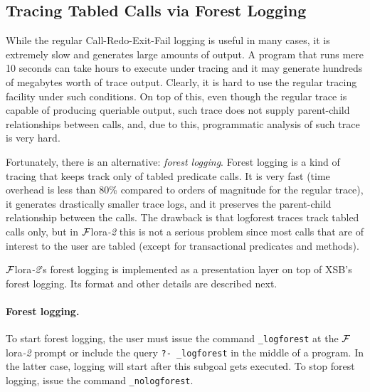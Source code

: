 \documentclass[11pt]{article}
\newcommand{\FLORA}{{\mbox{\sc ${\cal F}${lora}\rm\emph{-2}}}\xspace}
\begin{document}
\subsection{Tracing Tabled Calls via Forest Logging}

While the regular Call-Redo-Exit-Fail logging is useful in many cases, it
is extremely slow and generates large amounts of output. A program that
runs mere 10 seconds can take hours to execute under tracing and it may
generate hundreds of megabytes worth of trace output. Clearly, it is hard
to use the regular tracing facility under such conditions.
On top of this, even though the regular trace is capable of producing
queriable output, such trace does not supply parent-child 
relationships between calls, and, due to this, programmatic analysis of
such trace is very hard.

Fortunately, there is an alternative: \emph{forest logging}.
Forest logging is a kind of tracing that keeps track only of tabled
predicate calls. It is very fast (time overhead is less than 80\% compared
to orders of magnitude for the regular trace), it generates
drastically smaller trace logs, and it preserves the parent-child
relationship between the calls. The drawback is that logforest
traces track tabled calls
only, but in \FLORA this is not a serious problem since most calls that
are of interest to the user are
tabled (except for transactional predicates and methods).

\FLORA's forest logging is 
implemented as a presentation layer on top of XSB's forest logging.
Its format and other details are described next.

\paragraph{Forest logging.}
To start forest logging, the user
must issue the command {\tt \_logforest} at the \FLORA
prompt or include the query {\tt ?- \_logforest} in the middle of a program. 
In the latter case, logging will start after this subgoal gets
executed. 
To stop forest logging, issue the command {\tt \_nologforest}. 
\end{document}
